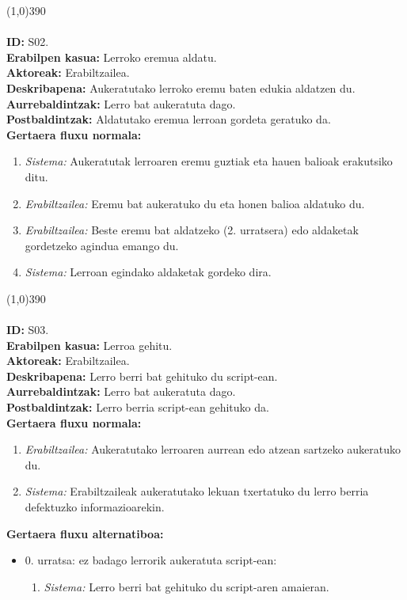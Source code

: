 \line(1,0){390}\\
\noindent\\
\textbf{ID:} S02.\\
\textbf{Erabilpen kasua:} Lerroko eremua aldatu.\\
\textbf{Aktoreak:} Erabiltzailea.\\
\textbf{Deskribapena:} Aukeratutako lerroko eremu baten edukia aldatzen du.\\
\textbf{Aurrebaldintzak:} Lerro bat aukeratuta dago.\\
\textbf{Postbaldintzak:} Aldatutako eremua lerroan gordeta geratuko da.\\
\textbf{Gertaera fluxu normala:}
\begin{enumerate}
	\item \textit{Sistema:} Aukeratutak lerroaren eremu guztiak eta hauen balioak erakutsiko ditu.
	\item \textit{Erabiltzailea:} Eremu bat aukeratuko du eta honen balioa aldatuko du.
	\item \textit{Erabiltzailea:} Beste eremu bat aldatzeko (2. urratsera) edo aldaketak gordetzeko agindua emango du.
	\item \textit{Sistema:} Lerroan egindako aldaketak gordeko dira.
\end{enumerate}
\line(1,0){390}\\
\noindent\\
\textbf{ID:} S03.\\
\textbf{Erabilpen kasua:} Lerroa gehitu.\\
\textbf{Aktoreak:} Erabiltzailea.\\
\textbf{Deskribapena:} Lerro berri bat gehituko du script-ean.\\
\textbf{Aurrebaldintzak:} Lerro bat aukeratuta dago.\\
\textbf{Postbaldintzak:} Lerro berria script-ean gehituko da.\\
\textbf{Gertaera fluxu normala:}
\begin{enumerate}
	\item \textit{Erabiltzailea:} Aukeratutako lerroaren aurrean edo atzean sartzeko aukeratuko du.
	\item \textit{Sistema:} Erabiltzaileak aukeratutako lekuan txertatuko du lerro berria defektuzko informazioarekin.
\end{enumerate}
\textbf{Gertaera fluxu alternatiboa:}
\begin{itemize}
	\item 0. urratsa: ez badago lerrorik aukeratuta script-ean:
		\begin{enumerate}
		\item \textit{Sistema:} Lerro berri bat gehituko du script-aren amaieran.
		\end{enumerate}
\end{itemize}
